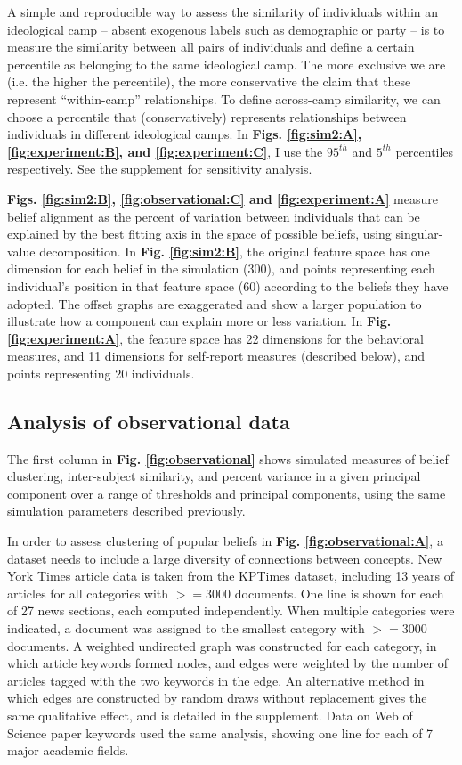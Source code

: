 \documentclass[9pt,twocolumn,twoside,lineno]{pnas-new}
\begin{document}
{A simple and reproducible way to assess the similarity of individuals within an ideological camp – absent exogenous labels such as demographic or party – is to measure the similarity between all pairs of individuals and define a certain percentile as belonging to the same ideological camp. The more exclusive we are (i.e. the higher the percentile), the more conservative the claim that these represent “within-camp” relationships. To define across-camp similarity, we can choose a percentile that (conservatively) represents relationships between individuals in different ideological camps. In \textbf{Figs. \ref{fig:sim2:A}, \ref{fig:experiment:B}, and \ref{fig:experiment:C}}, I use the $95^{th}$ and $5^{th}$ percentiles respectively. See the supplement for sensitivity analysis.

\textbf{Figs. \ref{fig:sim2:B}, \ref{fig:observational:C} and \ref{fig:experiment:A}} measure belief alignment as the percent of variation between individuals that can be explained by the best fitting axis in the space of possible beliefs, using singular-value decomposition. In \textbf{Fig. \ref{fig:sim2:B}}, the original feature space has one dimension for each belief in the simulation (300), and points representing each individual’s position in that feature space (60) according to the beliefs they have adopted. The offset graphs are exaggerated and show a larger population to illustrate how a component can explain more or less variation. In \textbf{Fig. \ref{fig:experiment:A}}, the feature space has 22 dimensions for the behavioral measures, and 11 dimensions for self-report measures (described below), and points representing 20 individuals.

\subsection*{Analysis of observational data}
The first column in \textbf{Fig. \ref{fig:observational}} shows simulated measures of belief clustering, inter-subject similarity, and percent variance in a given principal component over a range of thresholds and principal components, using the same simulation parameters described previously. 

In order to assess clustering of popular beliefs in \textbf{Fig. \ref{fig:observational:A}}, a dataset needs to include a large diversity of connections between concepts. New York Times article data is taken from the KPTimes dataset\cite{gallina2019kptimes}, including 13 years of articles for all categories with $>= 3000$ documents. One line is shown for each of 27 news sections, each computed independently. When multiple categories were indicated, a document was assigned to the smallest category with $>= 3000$ documents. A weighted undirected graph was constructed for each category, in which article keywords formed nodes, and edges were weighted by the number of articles tagged with the two keywords in the edge. An alternative method in which edges are constructed by random draws without replacement gives the same qualitative effect, and is detailed in the supplement. Data on Web of Science paper keywords\cite{kowsari2017HDLTex} used the same analysis, showing one line for each of 7 major academic fields. 

}
\end{document}
